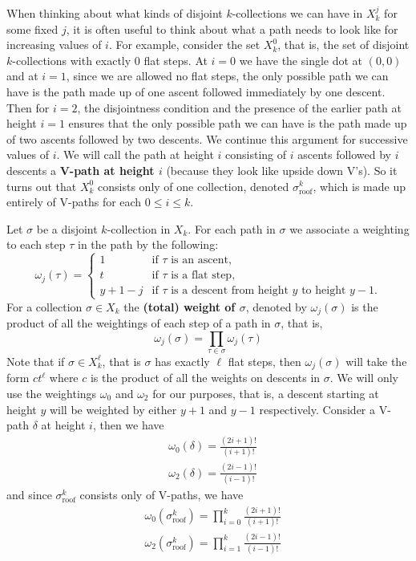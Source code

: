 \documentclass[11pt]{article}
\theoremstyle{definition}
\theoremstyle{definition}
\theoremstyle{plain}
\theoremstyle{plain}
\theoremstyle{plain}
\theoremstyle{definition}
\begin{document}
When thinking about what kinds of disjoint $k$-collections we can have in $X_k^j$ for some fixed $j$, it is often useful to think about what a path needs to look like for increasing values of $i$. For example, consider the set $X_k^0$, that is, the set of disjoint $k$-collections with exactly 0 flat steps. At $i = 0$ we have the single dot at $(0,0)$ and at $i = 1$, since we are allowed no flat steps, the only possible path we can have is the path made up of one ascent followed immediately by one descent. Then for $i = 2$, the disjointness condition and the presence of the earlier path at height $i=1$ ensures that the only possible path we can have is the path made up of two ascents followed by two descents. We continue this argument for successive values of $i$. We will call the path at height $i$ consisting of $i$ ascents followed by $i$ descents a \textbf{V-path at height $i$} (because they look like upside down V's). So it turns out that $X_k^0$ consists only of one collection, denoted $\sigma_{\text{roof}}^k$, which is made up entirely of V-paths for each $0\leq i\leq k$.

Let $\sigma$ be a disjoint $k$-collection in $X_k$. For each path in $\sigma$ we associate a weighting to each step $\tau$ in the path by the following:
\begin{equation*}
\omega_j(\tau) = \begin{cases} 
1 &\text{if $\tau$ is an ascent,} \\
t &\text{if $\tau$ is a flat step,} \\
y+1-j &\text{if $\tau$ is a descent from height $y$ to height $y-1$.}
\end{cases}
\end{equation*}
For a collection $\sigma\in X_k$ the \textbf{(total) weight of $\sigma$}, denoted by $\omega_j(\sigma)$ is the product of all the weightings of each step of a path in $\sigma$, that is,
\begin{equation*}
\omega_j(\sigma) = \prod\limits_{\tau\in\sigma}\omega_j(\tau)
\end{equation*}
Note that if $\sigma \in X_k^\ell$, that is $\sigma$ has exactly $\ell$ flat steps, then $\omega_j(\sigma)$ will take the form $ct^\ell$ where $c$ is the product of all the weights on descents in $\sigma$. We will only use the weightings $\omega_0$ and $\omega_2$ for our purposes, that is, a descent starting at height $y$ will be weighted by either $y+1$ and $y-1$ respectively. Consider a V-path $\delta$ at height $i$, then we have
\begin{align*}
&\omega_0(\delta) = \frac{(2i+1)!}{(i+1)!} \\
&\omega_2(\delta) = \frac{(2i-1)!}{(i-1)!}
\end{align*}
and since $\sigma_{\text{roof}}^k$ consists only of V-paths, we have
\begin{align*}
&\omega_0\left(\sigma_{\text{roof}}^k\right) = \prod\limits_{i=0}^k\frac{(2i+1)!}{(i+1)!} \\
&\omega_2\left(\sigma_{\text{roof}}^k\right) = \prod\limits_{i=1}^k\frac{(2i-1)!}{(i-1)!} \\
\end{align*}
\end{document}
